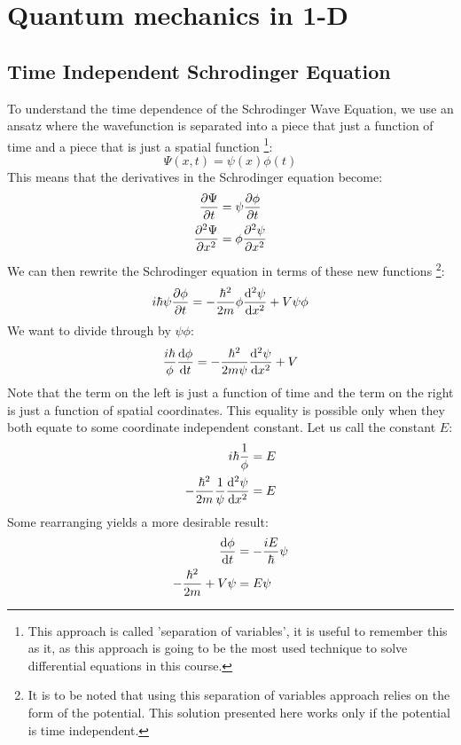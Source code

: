 \section{Quantum mechanics in 1-D}
\subsection{Time Independent Schrodinger Equation}
To understand the time dependence of the Schrodinger Wave Equation, we use an ansatz where the wavefunction is separated into a piece that just a function of time and a piece that is just a spatial function \footnote{This approach is called 'separation of variables', it is useful to remember this as it, as this approach is going to be the most used technique to solve differential equations in this course.}:
\begin{equation*}
  \Psi(x,t)=\psi(x)\phi(t)
\end{equation*}
This means that the derivatives in the Schrodinger equation become:
\begin{align*}
  \pdv{\Psi}{t}&=\psi\pdv{\phi}{t} \\
  \pdv[2]{\Psi}{x}&=\phi\pdv[2]{\psi}{x}
\end{align*}
We can then rewrite the Schrodinger equation in terms of these new functions \footnote{It is to be noted that using this separation of variables approach relies on the form of the potential. This solution presented here works only if the potential is time independent.}:
\begin{align*}
  i\hbar\psi\pdv{\phi}{t}=-\dfrac{\hbar^2}{2m}\phi\dv[2]{\psi}{x}+V\psi\phi
\end{align*}
We want to divide through by $\psi\phi$:
\begin{align*}
  \dfrac{i\hbar}{\phi}\dv{\phi}{t}=-\dfrac{\hbar^2}{2m\psi}\dv[2]{\psi}{x}+V
\end{align*}
Note that the term on the left is just a function of time and the term on the right is just a function of spatial coordinates. This equality is possible only when they both equate to some coordinate independent constant. Let us call the constant $E$:
\begin{align*}
  i\hbar\dfrac{1}{\phi}&=E \\
  -\dfrac{\hbar^2}{2m}\dfrac{1}{\psi}\dv[2]{\psi}{x}&=E
\end{align*}
Some rearranging yields a more desirable result:
\begin{align*}
  \dv{\phi}{t}&=-\dfrac{iE}{\hbar}\psi \\
  -\dfrac{\hbar^2}{2m}+V\psi&=E\psi
\end{align*}
